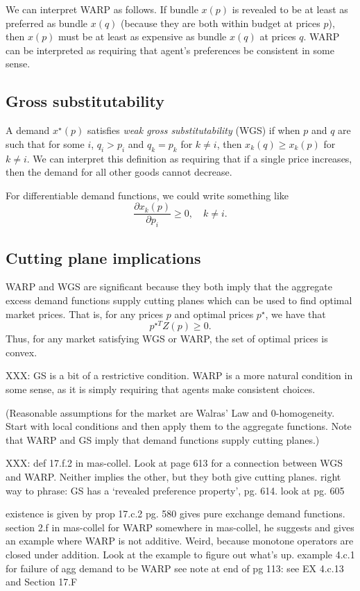 \documentclass[12pt]{article}
\begin{document}
We can interpret WARP as follows.
If bundle $x(p)$ is revealed to be at least as preferred as bundle
$x(q)$ (because they are both within budget at prices $p$), then
$x(p)$ must be at least as expensive as bundle $x(q)$ at prices $q$.
WARP can be interpreted as requiring that agent's preferences be
consistent in some sense.

\subsection{Gross substitutability}
A demand $x^\star(p)$ satisfies \emph{weak gross substitutability} (WGS)
if when $p$ and $q$ are such that for some $i$, $q_i > p_i$ and
$q_k = p_k$ for $k \neq i$, then $x_k(q) \geq x_k(p)$ for $k \neq i$.
We can interpret this definition as requiring that if a single price increases,
then the demand for all other goods cannot decrease.

For differentiable demand functions, we could write something like
\[
\frac{\partial x_k(p)}{\partial p_i} \geq 0,\quad k \neq i.
\]


\subsection{Cutting plane implications}
WARP and WGS are significant because they both imply that
the aggregate excess demand functions supply cutting planes which can
be used to find optimal market prices.
That is, for any prices $p$ and optimal prices $p^\star$, we have that
\[
p^{\star T} Z(p) \geq 0.
\]
Thus, for any market satisfying WGS or WARP, the set of optimal prices
is convex.

XXX: GS is a bit of a restrictive condition. WARP is a more natural condition in some
sense, as it is simply requiring that agents make consistent choices.

(Reasonable assumptions for the market are Walras' Law and 0-homogeneity.
Start with local conditions and then apply them to the aggregate functions.
Note that WARP and GS imply that demand functions supply cutting planes.)

XXX: def 17.f.2 in mas-collel. Look at page 613 for a connection
between WGS and WARP. Neither implies the other, but they both give cutting
planes. right way to phrase: GS has a `revealed preference property', pg. 614.
look at pg. 605

existence is given by prop 17.c.2
pg. 580 gives pure exchange demand functions.
section 2.f in mas-collel for WARP
somewhere in mas-collel, he suggests and gives an example where
WARP is not additive. Weird, because monotone operators are closed under addition.
Look at the example to figure out what's up.
example 4.c.1 for failure of agg demand to be WARP
see note at end of pg 113: see EX 4.c.13 and Section 17.F
\end{document}
